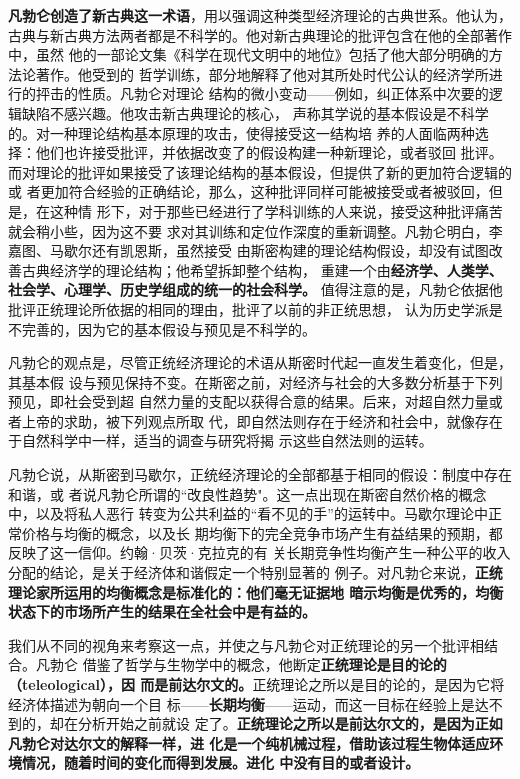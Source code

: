 \textbf{凡勃仑创造了新古典这一术语}，用以强调这种类型经济理论的古典世系。他认为，
古典与新古典方法两者都是不科学的。他对新古典理论的批评包含在他的全部著作中，虽然
他的一部论文集《科学在现代文明中的地位》包括了他大部分明确的方法论著作。他受到的
哲学训练，部分地解释了他对其所处时代公认的经济学所进行的抨击的性质。凡勃仑对理论
结构的微小变动——例如，纠正体系中次要的逻辑缺陷不感兴趣。他攻击新古典理论的核心，
声称其学说的基本假设是不科学的。对一种理论结构基本原理的攻击，使得接受这一结构培
养的人面临两种选择：他们也许接受批评，并依据改变了的假设构建一种新理论，或者驳回
批评。而对理论的批评如果接受了该理论结构的基本假设，但提供了新的更加符合逻辑的或
者更加符合经验的正确结论，那么，这种批评同样可能被接受或者被驳回，但是，在这种情
形下，对于那些已经进行了学科训练的人来说，接受这种批评痛苦就会稍小些，因为这不要
求对其训练和定位作深度的重新调整。凡勃仑明白，李嘉图、马歇尔还有凯恩斯，虽然接受
由斯密构建的理论结构假设，却没有试图改善古典经济学的理论结构；他希望拆卸整个结构，
重建一个由\textbf{经济学、人类学、社会学、心理学、历史学组成的统一的社会科学。}
值得注意的是，凡勃仑依据他批评正统理论所依据的相同的理由，批评了以前的非正统思想，
认为历史学派是不完善的，因为它的基本假设与预见是不科学的。

凡勃仑的观点是，尽管正统经济理论的术语从斯密时代起一直发生着变化，但是，其基本假
设与预见保持不变。在斯密之前，对经济与社会的大多数分析基于下列预见，即社会受到超
自然力量的支配以获得合意的结果。后来，对超自然力量或者上帝的求助，被下列观点所取
代，即自然法则存在于经济和社会中，就像存在于自然科学中一样，适当的调查与研究将揭
示这些自然法则的运转。

凡勃仑说，从斯密到马歇尔，正统经济理论的全部都基于相同的假设：制度中存在和谐，或
者说凡勃仑所谓的“改良性趋势"。这一点出现在斯密自然价格的概念中，以及将私人恶行
转变为公共利益的“看不见的手”的运转中。马歇尔理论中正常价格与均衡的概念，以及长
期均衡下的完全竞争市场产生有益结果的预期，都反映了这一信仰。约翰·贝茨·克拉克的有
关长期竞争性均衡产生一种公平的收入分配的结论，是关于经济体和谐假定一个特别显著的
例子。对凡勃仑来说，\textbf{正统理论家所运用的均衡概念是标准化的：他们毫无证据地
暗示均衡是优秀的，均衡状态下的市场所产生的结果在全社会中是有益的。}

我们从不同的视角来考察这一点，并使之与凡勃仑对正统理论的另一个批评相结合。凡勃仑
借鉴了哲学与生物学中的概念，他断定\textbf{正统理论是目的论的（teleological），因
而是前达尔文的。}正统理论之所以是目的论的，是因为它将经济体描述为朝向一个目
标——\textbf{长期均衡}——运动，而这一目标在经验上是达不到的，却在分析开始之前就设
定了。\textbf{正统理论之所以是前达尔文的，是因为正如凡勃仑对达尔文的解释一样，进
化是一个纯机械过程，借助该过程生物体适应环境情况，随着时间的变化而得到发展。进化
中没有目的或者设计。}

